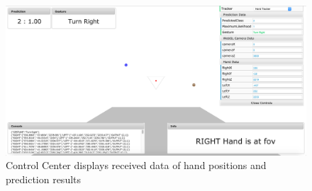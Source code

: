 \begin{figure}
	[h] \centering 
	\includegraphics[width=145mm]{figures/content/cc-hand.jpg} \caption{Control Center displays received data of hand positions and prediction results} \label{fg:cc:hand} 
\end{figure}